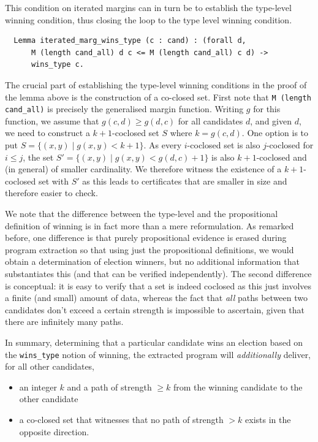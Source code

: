 \noindent
This condition on iterated margins can in turn be to establish the
type-level winning condition, thus closing the loop to the type
level winning condition.

\begin{verbatim}
  Lemma iterated_marg_wins_type (c : cand) : (forall d,
      M (length cand_all) d c <= M (length cand_all) c d) ->
      wins_type c.
\end{verbatim}

\noindent
The crucial part of establishing the type-level winning conditions
in the proof of the lemma above is the construction of a co-closed
set. 
First note that \texttt{M (length cand\_all)} is precisely
the generalised margin function. Writing $g$ for this function, we
assume that $g(c, d) \geq g(d, c)$ for all candidates $d$, and given
$d$, we need to construct a $k+1$-coclosed set $S$ where $k = g(c, d)$.
One option is to put
$S = \lbrace (x, y) \mid g(x, y) < k+1 \rbrace$. As every
$i$-coclosed set is also $j$-coclosed for $i \leq j$, the set $S' =
\lbrace (x, y) \mid g(x, y) < g(d, c) + 1 \rbrace$ is also
$k+1$-coclosed and (in general) of smaller cardinality. We therefore
witness the existence of a $k+1$-coclosed set with $S'$ as this
leads to certificates that are smaller in size and therefore easier
to check.

We note that the difference between the type-level and the
propositional definition of winning 
is in fact more than a mere reformulation. As remarked before, one
difference is that purely propositional evidence is erased during
program extraction so that using just the propositional definitions,
we would obtain a determination of election winners, but no
additional information that substantiates this (and that can be
verified independently). The second difference is conceptual: it is
easy to verify that a set is indeed coclosed as this just involves a
finite (and small) amount of data, whereas the fact that \emph{all} paths
between two candidates don't exceed a certain strength is impossible
to ascertain, given that there are infinitely many paths.

In summary, determining that a particular candidate wins an election
based on the \texttt{wins\_type} notion of winning, the extracted
program will \emph{additionally} deliver, for all other candidates,
\begin{itemize}
\item an integer $k$ and a path of strength $\geq k$ from the winning candidate to the
other candidate 
\item a co-closed set that witnesses that no path of strength $>k$
exists in the opposite direction.
\end{itemize}

